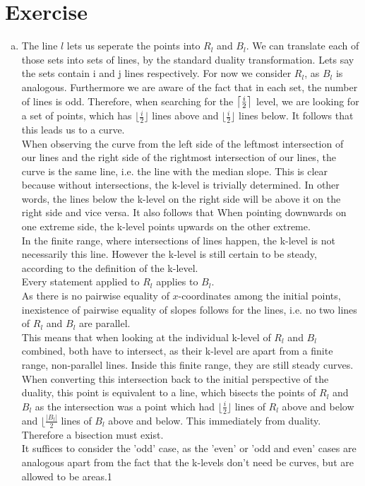 \documentclass{article}
\DeclarePairedDelimiter{\ceil}{\lceil}{\rceil}
\newcounter{homeworkProblemCounter} %
\newcommand{\homeworkProblemName}{}
\newenvironment{homeworkProblem}[1][Exercise \arabic{homeworkProblemCounter}]{ %
\stepcounter{homeworkProblemCounter} %
\renewcommand{\homeworkProblemName}{#1} %
\section{\homeworkProblemName} %
}{
}
\begin{document}
\begin{homeworkProblem}
\begin{enumerate}[(a)]
\item %
The line $l$ lets us seperate the points into $R_l$ and $B_l$. We can translate each of those sets into sets of lines, by the standard duality transformation. Lets say the sets contain i and j lines respectively. For now we consider $R_l$, as $B_l$ is analogous. Furthermore we are aware of the fact that in each set, the number of lines is odd.  Therefore, when searching for the $\ceil[\big]{\frac{i}{2}}$ level, we are looking for a set of points, which has $ \lfloor \frac{i}{2} \rfloor$ lines above and $ \lfloor \frac{i}{2} \rfloor$ lines below. It follows that this leads us to a curve.  \\
When observing the curve from the left side of the leftmost intersection of our lines and the right side of the rightmost intersection of our lines, the curve is the same line, i.e. the line with the median slope. This is clear because without intersections, the k-level is trivially determined. In other words, the lines below the k-level on the right side will be above it on the right side and vice versa. It also follows that When pointing downwards on one extreme side, the k-level points upwards on the other extreme.\\
In the finite range, where intersections of lines happen, the k-level is not necessarily this line. However the k-level is still certain to be steady, according to the definition of the k-level. \\
Every statement applied to $R_l$ applies to $B_l$. \\
As there is no pairwise equality of $x$-coordinates among the initial points, inexistence of pairwise equality of slopes follows for the lines, i.e. no two lines of $R_l$ and $B_l$ are parallel. \\
This means that when looking at the individual k-level of $R_l$ and $B_l$ combined, both have to intersect, as their k-level are apart from a finite range, non-parallel lines. Inside this finite range, they are still steady curves. \\
When converting this intersection back to the initial perspective of the duality, this point is equivalent to a line, which bisects the points of $R_l$ and $B_l$ as the intersection was a point which had $ \lfloor \frac{i}{2} \rfloor$ lines of $R_l$ above and below and $ \lfloor \frac{|B_l|}{2}$ lines of $B_l$ above and below. This immediately from duality. Therefore a bisection must exist. \\
It suffices to consider the 'odd' case, as the 'even' or 'odd and even' cases are analogous apart from the fact that the k-levels don't need be curves, but are allowed to be areas.1


\end{enumerate}
\end{homeworkProblem}
\end{document}
